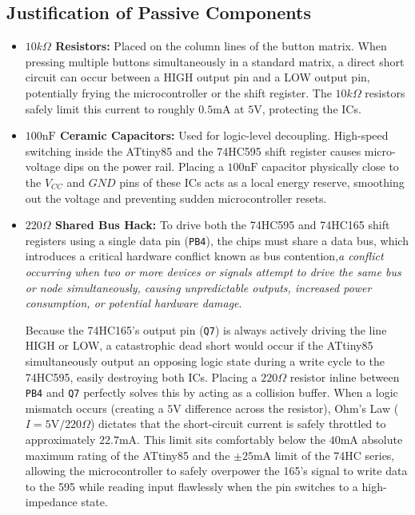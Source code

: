 \documentclass[conference]{IEEEtran}
\begin{document}
\subsection{Justification of Passive Components}
\begin{itemize}
    \item \textbf{$10k\Omega$ Resistors:} Placed on the column lines of the button matrix. When pressing multiple buttons simultaneously in a standard matrix, a direct short circuit can occur between a HIGH output pin and a LOW output pin, potentially frying the microcontroller or the shift register. The $10k\Omega$ resistors safely limit this current to roughly $0.5\text{mA}$ at $5\text{V}$, protecting the ICs.
    \item \textbf{$100\text{nF}$ Ceramic Capacitors:} Used for logic-level decoupling. High-speed switching inside the ATtiny85 and the 74HC595 shift register causes micro-voltage dips on the power rail. Placing a $100\text{nF}$ capacitor physically close to the $V_{CC}$ and $GND$ pins of these ICs acts as a local energy reserve, smoothing out the voltage and preventing sudden microcontroller resets.
    \item \textbf{$220\Omega$ Shared Bus Hack:} To drive both the 74HC595 and 74HC165 shift registers using a single data pin (\texttt{PB4}), the chips must share a data bus, which introduces a critical hardware conflict known as bus contention,\textit{a conflict occurring when two or more devices or signals attempt to drive the same bus or node simultaneously, causing unpredictable outputs, increased power consumption, or potential hardware damage}. 
    
    Because the 74HC165's output pin (\texttt{Q7}) is always actively driving the line HIGH or LOW, a catastrophic dead short would occur if the ATtiny85 simultaneously output an opposing logic state during a write cycle to the 74HC595, easily destroying both ICs. Placing a $220\Omega$ resistor inline between \texttt{PB4} and \texttt{Q7} perfectly solves this by acting as a collision buffer. When a logic mismatch occurs (creating a $5\text{V}$ difference across the resistor), Ohm's Law ($I = 5\text{V} / 220\Omega$) dictates that the short-circuit current is safely throttled to approximately $22.7\text{mA}$. This limit sits comfortably below the $40\text{mA}$ absolute maximum rating of the ATtiny85 and the $\pm 25\text{mA}$ limit of the 74HC series, allowing the microcontroller to safely overpower the 165's signal to write data to the 595 while reading input flawlessly when the pin switches to a high-impedance state.
\end{itemize}
\end{document}
